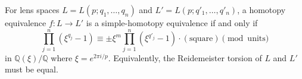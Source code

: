 For lens spaces $L = L(p; q_1, \ldots, q_n)$ and $L' = L(p; q'_1, \ldots, q'_n)$, a homotopy equivalence $f: L \rightarrow L'$ is a simple-homotopy equivalence if and only if
$$\prod_{j=1}^n (\xi^{q_j} - 1) \equiv \pm \xi^m \prod_{j=1}^n (\xi^{q'_j} - 1) \cdot (\text{square}) \pmod{\text{units}}$$
in $\mathbb{Q}(\xi)/\mathbb{Q}$ where $\xi = e^{2\pi i/p}$. Equivalently, the Reidemeister torsion of $L$ and $L'$ must be equal.
